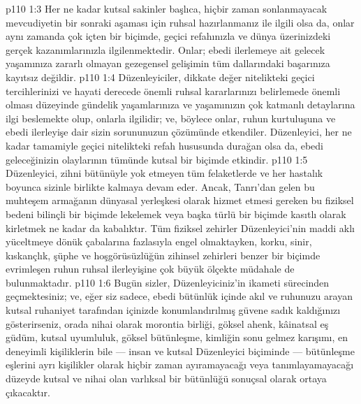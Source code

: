 \vs p110 1:3 Her ne kadar kutsal sakinler başlıca, hiçbir zaman sonlanmayacak mevcudiyetin bir sonraki aşaması için ruhsal hazırlanmanız ile ilgili olsa da, onlar aynı zamanda çok içten bir biçimde, geçici refahınızla ve dünya üzerinizdeki gerçek kazanımlarınızla ilgilenmektedir. Onlar; ebedi ilerlemeye ait gelecek yaşamınıza zararlı olmayan gezegensel gelişimin tüm dallarındaki başarınıza kayıtsız değildir.
\vs p110 1:4 Düzenleyiciler, dikkate değer nitelikteki geçici tercihlerinizi ve hayati derecede önemli ruhsal kararlarınızı belirlemede önemli olması düzeyinde gündelik yaşamlarınıza ve yaşamınızın çok katmanlı detaylarına ilgi beslemekte olup, onlarla ilgilidir; ve, böylece onlar, ruhun kurtuluşuna ve ebedi ilerleyişe dair sizin sorununuzun çözümünde etkendiler. Düzenleyici, her ne kadar tamamiyle geçici nitelikteki refah hususunda durağan olsa da, ebedi geleceğinizin olaylarının tümünde kutsal bir biçimde etkindir.
\vs p110 1:5 Düzenleyici, zihni bütünüyle yok etmeyen tüm felaketlerde ve her hastalık boyunca sizinle birlikte kalmaya devam eder. Ancak, Tanrı’dan gelen bu muhteşem armağanın dünyasal yerleşkesi olarak hizmet etmesi gereken bu fiziksel bedeni bilinçli bir biçimde lekelemek veya başka türlü bir biçimde kasıtlı olarak kirletmek ne kadar da kabalıktır. Tüm fiziksel zehirler Düzenleyici’nin maddi aklı yüceltmeye dönük çabalarına fazlasıyla engel olmaktayken, korku, sinir, kıskançlık, şüphe ve hoşgörüsüzlüğün zihinsel zehirleri benzer bir biçimde evrimleşen ruhun ruhsal ilerleyişine çok büyük ölçekte müdahale de bulunmaktadır.
\vs p110 1:6 Bugün sizler, Düzenleyiciniz’in ikameti sürecinden geçmektesiniz; ve, eğer siz sadece, ebedi bütünlük içinde akıl ve ruhunuzu arayan kutsal ruhaniyet tarafından içinizde konumlandırılmış güvene sadık kaldığınızı gösterirseniz, orada nihai olarak morontia birliği, göksel ahenk, kâinatsal eş güdüm, kutsal uyumluluk, göksel bütünleşme, kimliğin sonu gelmez karışımı, en deneyimli kişiliklerin bile --- insan ve kutsal Düzenleyici biçiminde --- bütünleşme eşlerini ayrı kişilikler olarak hiçbir zaman ayıramayacağı veya tanımlayamayacağı düzeyde kutsal ve nihai olan varlıksal bir bütünlüğü sonuçsal olarak ortaya çıkacaktır.
